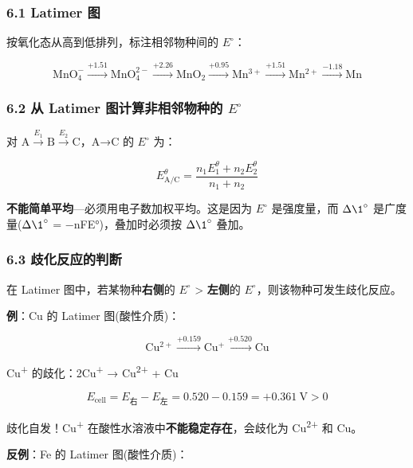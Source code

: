 \documentclass[a4paper,11pt]{ctexart}
\begin{document}
\subsubsection{6.1 Latimer 图}\label{latimer-ux56fe}

按氧化态从高到低排列，标注相邻物种间的 \(E^{\circ}\)：

\[
\mathrm{MnO_4^-} \xrightarrow{+1.51} \mathrm{MnO_4^{2-}} \xrightarrow{+2.26} \mathrm{MnO_2} \xrightarrow{+0.95} \mathrm{Mn^{3+}} \xrightarrow{+1.51} \mathrm{Mn^{2+}} \xrightarrow{-1.18} \mathrm{Mn}
\]

\subsubsection{\texorpdfstring{6.2 从 Latimer 图计算非相邻物种的 \(E^{\circ}\)}{6.2 从 Latimer 图计算非相邻物种的 E\^{}\{\textbackslash circ\}}}\label{ux4ece-latimer-ux56feux8ba1ux7b97ux975eux76f8ux90bbux7269ux79cdux7684-ecirc}

对 \(\mathrm{A} \xrightarrow{E_1} \mathrm{B} \xrightarrow{E_2} \mathrm{C}\)，A→C 的 \(E^{\circ}\) 为：

\[
E^\theta_{\mathrm{A/C}} = \frac{n_1 E_1^\theta + n_2 E_2^\theta}{n_1 + n_2}
\]

\textbf{不能简单平均}---必须用电子数加权平均。这是因为 \(E^{\circ}\) 是强度量，而 \(\Delta \1^{\circ}\) 是广度量(\(\Delta \1^{\circ}\) = −nFE°)，叠加时必须按 \(\Delta \1^{\circ}\) 叠加。

\subsubsection{6.3 歧化反应的判断}\label{ux6b67ux5316ux53cdux5e94ux7684ux5224ux65ad}

在 Latimer 图中，若某物种\textbf{右侧}的 \(E^{\circ}\) \textgreater{} \textbf{左侧}的 \(E^{\circ}\)，则该物种可发生歧化反应。

\textbf{例}：Cu 的 Latimer 图(酸性介质)：

\[\mathrm{Cu^{2+}} \xrightarrow{+0.159} \mathrm{Cu^+} \xrightarrow{+0.520} \mathrm{Cu}\]

Cu\textsuperscript{+} 的歧化：2Cu\textsuperscript{+} → Cu\textsuperscript{2+} + Cu

\[E_{\text{cell}} = E_{\text{右}} - E_{\text{左}} = 0.520 - 0.159 = +0.361\ \mathrm{V} > 0\]

歧化自发！Cu\textsuperscript{+} 在酸性水溶液中\textbf{不能稳定存在}，会歧化为 Cu\textsuperscript{2+} 和 Cu。

\textbf{反例}：Fe 的 Latimer 图(酸性介质)：
\end{document}
